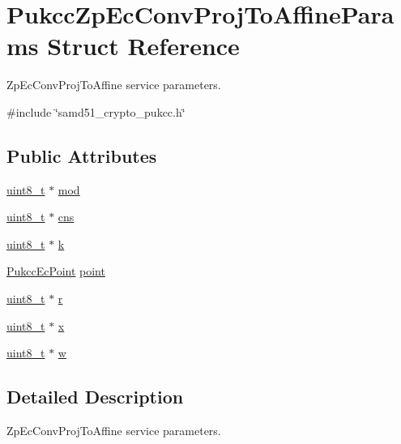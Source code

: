 \hypertarget{structPukccZpEcConvProjToAffineParams}{}\section{Pukcc\+Zp\+Ec\+Conv\+Proj\+To\+Affine\+Params Struct Reference}
\label{structPukccZpEcConvProjToAffineParams}


Zp\+Ec\+Conv\+Proj\+To\+Affine service parameters.  




{\ttfamily \#include \char`\"{}samd51\+\_\+crypto\+\_\+pukcc.\+h\char`\"{}}

\subsection*{Public Attributes}
\begin{DoxyCompactItemize}
\item 
\hyperlink{stdint_8h_aba7bc1797add20fe3efdf37ced1182c5}{uint8\+\_\+t} $\ast$ \hyperlink{structPukccZpEcConvProjToAffineParams_ae88d80c3f737369d97fef8eee0ccd259}{mod}
\item 
\hyperlink{stdint_8h_aba7bc1797add20fe3efdf37ced1182c5}{uint8\+\_\+t} $\ast$ \hyperlink{structPukccZpEcConvProjToAffineParams_ab59ca2d053334a58d48b0b5fbdff80ca}{cns}
\item 
\hyperlink{stdint_8h_aba7bc1797add20fe3efdf37ced1182c5}{uint8\+\_\+t} $\ast$ \hyperlink{structPukccZpEcConvProjToAffineParams_ad3930ba10bd5dd5dfedfa3aaf77b8e39}{k}
\item 
\hyperlink{structPukccEcPoint}{Pukcc\+Ec\+Point} \hyperlink{structPukccZpEcConvProjToAffineParams_a7b28148b8e16f21b12a8746b6c98e2c8}{point}
\item 
\hyperlink{stdint_8h_aba7bc1797add20fe3efdf37ced1182c5}{uint8\+\_\+t} $\ast$ \hyperlink{structPukccZpEcConvProjToAffineParams_a30174fc63e44174069573380c4120629}{r}
\item 
\hyperlink{stdint_8h_aba7bc1797add20fe3efdf37ced1182c5}{uint8\+\_\+t} $\ast$ \hyperlink{structPukccZpEcConvProjToAffineParams_ab12cdac26be3a52042a7fb51d299a6b6}{x}
\item 
\hyperlink{stdint_8h_aba7bc1797add20fe3efdf37ced1182c5}{uint8\+\_\+t} $\ast$ \hyperlink{structPukccZpEcConvProjToAffineParams_ac83a15ac7474fcbc20cc1b441a857910}{w}
\end{DoxyCompactItemize}


\subsection{Detailed Description}
Zp\+Ec\+Conv\+Proj\+To\+Affine service parameters. 

